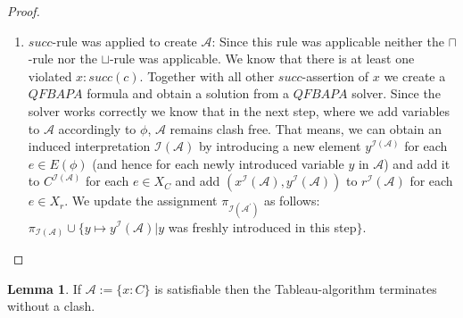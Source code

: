 \documentclass[a4paper,11pt]{scrartcl}
\theoremstyle{break}
\theoremstyle{definition}
\newtheorem{mylem}{Lemma}
\begin{document}
\begin{proof}
\begin{enumerate}
\item $succ$-rule was applied to create $\mathcal{A}$: Since this rule was applicable neither the $\sqcap$-rule nor the $\sqcup$-rule was applicable. We know that there is at least one violated $x:succ(c)$. Together with all other $succ$-assertion of $x$ we create a $QFBAPA$ formula and obtain a solution from a $QFBAPA$ solver. Since the solver works correctly we know that in the next step, where we add variables to $\mathcal{A}$ accordingly to $\phi$, $\mathcal{A}$ remains clash free. That means, we can obtain an induced interpretation $\mathcal{I}(\mathcal{A})$ by introducing a new element $y^{\mathcal{I}(\mathcal{A})}$ for each $e\in E(\phi)$ (and hence for each newly introduced variable $y$ in $\mathcal{A}$) and add it to $C^{\mathcal{I}(\mathcal{A})}$ for each $e\in X_C$ and add $(x^\mathcal{I}(\mathcal{A}),y^\mathcal{I}(\mathcal{A}))$ to $r^\mathcal{I}(\mathcal{A})$ for each $e\in X_r$. We update the assignment $\pi_{\mathcal{I}(\mathcal{A}^\prime)}$ as follows: $\pi_{\mathcal{I}(\mathcal{A})}\cup\{y\mapsto y^\mathcal{I}(\mathcal{A})|y$ was freshly introduced in this step$\}$.
\end{enumerate}
\end{proof}
\begin{mylem}
If $\mathcal{A}:=\{x:C\}$ is satisfiable then the Tableau-algorithm terminates without a clash.
\end{mylem}
\end{document}
